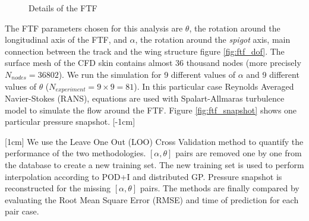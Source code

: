 \begin{figure}[!ht]
  \centering
  \quad
  \quad
      \caption{Details of the FTF}
\end{figure}

The FTF parameters chosen for this analysis are $\theta$, the rotation around the longitudinal axis of the FTF, and $\alpha$, the rotation around the {\it spigot} axis, main connection between the track and the wing structure figure \ref{fig:ftf_dof}. The surface mesh of the CFD skin contains almost 36 thousand nodes (more precisely $N_{nodes} = 36802$). We run the simulation for 9 different values of $\alpha$ and 9 different values of $\theta$ ($N_{experiment} = 9\times9 = 81$). In this particular case Reynolds Averaged  Navier-Stokes (RANS), equations are used with Spalart-Allmaras turbulence model to simulate the flow around the FTF. Figure \ref{fig:ftf_snapshot} shows one particular pressure snapshot. 
[-1cm]

[1cm]
We use the Leave One Out (LOO) Cross Validation method to quantify the performance of the two methodologies. $[\alpha, \theta]$ pairs are removed one by one from the database to create a new training set. The new training set is used to perform interpolation according to POD+I and distributed GP. Pressure snapshot is reconstructed for the missing $[\alpha, \theta]$ pairs. The methods are finally compared by evaluating the Root Mean Square Error (RMSE) and time of prediction for each pair case. 

